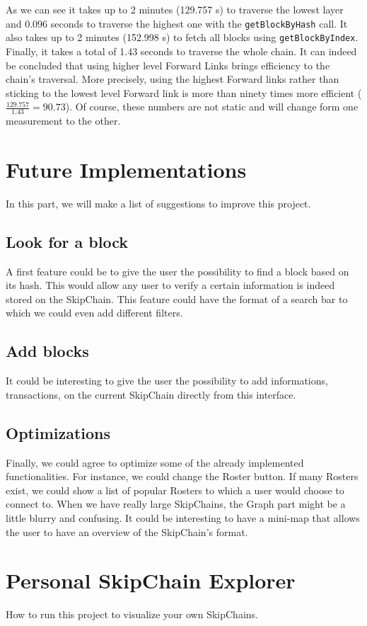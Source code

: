 \documentclass[11pt, a4paper, twoside, openright]{article} %
\begin{document}
{As we can see it takes up to 2 minutes (129.757 s) to traverse the lowest layer and 0.096 seconds to traverse the highest one with the \verb|getBlockByHash| call. It also takes up to 2 minutes (152.998 s) to fetch all blocks using \verb|getBlockByIndex|.
Finally, it takes a total of 1.43 seconds to traverse the whole chain.
It can indeed be concluded that using higher level Forward Links brings efficiency to the chain's traversal. More precisely, using the highest Forward links rather than sticking to the lowest level Forward link is more than ninety times more efficient ($\frac{129.757}{1.43} = 90.73$). Of course, these numbers are not static and will change form one measurement to the other.
\section{Future Implementations}
In this part, we will make a list of suggestions to improve this project.
\subsection{Look for a block}
A first feature could be to give the user the possibility to find a block based on its hash. This would allow any user to verify a certain information is indeed stored on the SkipChain. This feature could have the format of a search bar to which we could even add different filters.
\subsection{Add blocks}
It could be interesting to give the user the possibility to add informations, transactions, on the current SkipChain directly from this interface. 
\subsection{Optimizations}
Finally, we could agree to optimize some of the already implemented functionalities. For instance, we could change the Roster button. If many Rosters exist, we could show a list of popular Rosters to which a user would choose to connect to.
When we have really large SkipChains, the Graph part might be a little blurry and confusing. It could be interesting to have a mini-map that allows the user to have an overview of the SkipChain's format.
\section{Personal SkipChain Explorer}
How to run this project to visualize your own SkipChains.
}
\end{document}
